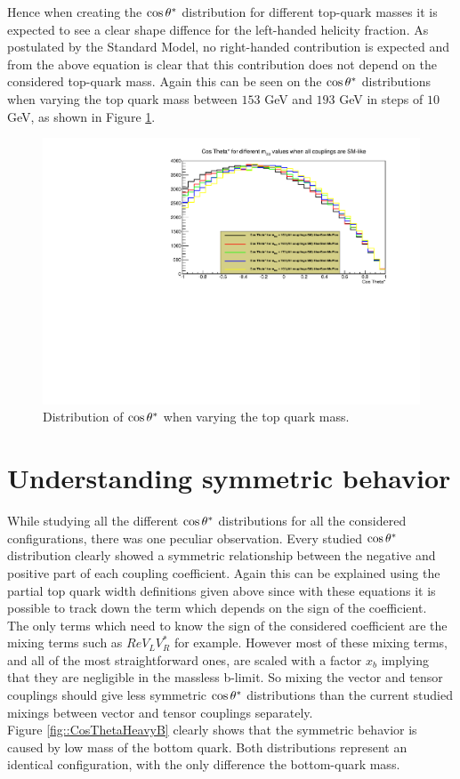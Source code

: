 Hence when creating the $\cos \theta^{*}$ distribution for different top-quark masses it is expected to see a clear shape diffence for the left-handed helicity fraction. As postulated by the Standard Model, no right-handed contribution is expected and from the above equation is clear that this contribution does not depend on the considered top-quark mass. Again this can be seen on the $\cos \theta^{*}$ distributions when varying the top quark mass between $153$ GeV and $193$ GeV in steps of $10$ GeV, as shown in Figure \ref{fig::CosThetaTopMass}.

\begin{figure}[!h]
 \centering
 \includegraphics[width = 0.85 \textwidth]{Afbeeldingen/Chapter_LinkWithTopWidth/CosThetaResults/RVLvsRVR/RVLRVR_CosTheta_CosTheta_TopMassVaried.pdf}
 \caption{Distribution of $\cos \theta^{*}$ when varying the top quark mass.}
 \label{fig::CosThetaTopMass}
\end{figure}

\section{Understanding symmetric behavior}

While studying all the different $\cos \theta^{*}$ distributions for all the considered configurations, there was one peculiar observation. Every studied $\cos \theta^{*}$ distribution clearly showed a symmetric relationship between the negative and positive part of each coupling coefficient. Again this can be explained using the partial top quark width definitions given above since with these equations it is possible to track down the term which depends on the sign of the coefficient.\\
The only terms which need to know the sign of the considered coefficient are the mixing terms such as $Re V_{L} V_{R}^{*}$ for example. However most of these mixing terms, and all of the most straightforward ones, are scaled with a factor $x_{b}$ implying that they are negligible in the massless b-limit. So mixing the vector and tensor couplings should give less symmetric $\cos \theta^{*}$ distributions than the current studied mixings between vector and tensor couplings separately.\\
Figure \ref{fig::CosThetaHeavyB} clearly shows that the symmetric behavior is caused by low mass of the bottom quark. Both distributions represent an identical configuration, with the only difference the bottom-quark mass.

